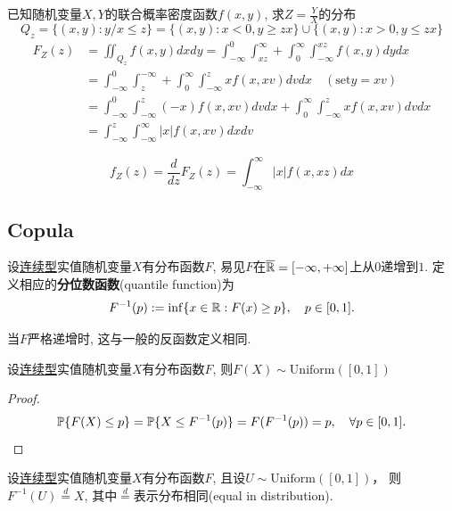 \begin{example}
    已知随机变量$X,Y$的联合概率密度函数$f(x,y)$, 求$Z=\frac{Y}{X}$的分布
    \[ Q_{z}=\{(x, y): y / x \leq z\}=\{(x, y): x<0, y \geq z x\} \cup\{(x, y): x>0, y \leq z x\} \]
    \begin{align*}
        F_{Z}(z) & =\iint_{Q_{z}} f(x, y) d x d y=\int_{-\infty}^{0} \int_{x z}^{\infty}+\int_{0}^{\infty} \int_{-\infty}^{x z} f(x, y) d y d x \\
                 & =\int_{-\infty}^{0} \int_{z}^{-\infty}+\int_{0}^{\infty} \int_{-\infty}^{z} x f(x, x v) d v d x \quad(\text{set} y=x v)      \\
                 & =\int_{-\infty}^{0} \int_{-\infty}^{z}(-x) f(x, x v) d v d x+\int_{0}^{\infty} \int_{-\infty}^{z} x f(x, xv) dvdx            \\
                 & =\int_{-\infty}^{z} \int_{-\infty}^{\infty}|x| f(x, xv) dxdv
    \end{align*}

    \[ f_Z(z)=\frac{d}{dz}F_Z(z)=\int_{-\infty}^{\infty}|x|f(x,xz)dx \]
\end{example}

\subsection{Copula}\label{subsec:Copula}
\begin{definition}
    设\underline{连续型}实值随机变量$X$有分布函数$F$, 易见$F$在$\overline{\R}=[-\infty,+\infty]$上从$0$递增到$1$. 定义相应的\textbf{分位数函数}(quantile function)为
    \[ F^{-1}(p) := \inf\{x\in\R:F(x)\ge p\}, \quad p \in [0,1]. \]
\end{definition}
\begin{remark}
    当$F$严格递增时, 这与一般的反函数定义相同.
\end{remark}

\begin{theorem}
    设\underline{连续型}实值随机变量$X$有分布函数$F$, 则$F(X) \sim \mathrm{Uniform}([0,1])$
\end{theorem}

\begin{proof}
    \[ \P\{F(X)\le p\} = \P\{X\le F^{-1}(p)\} = F(F^{-1}(p)) =p, \quad \forall p \in [0,1]. \]
\end{proof}

\begin{theorem}
    设\underline{连续型}实值随机变量$X$有分布函数$F$, 且设$U\sim\mathrm{Uniform}([0,1]) $， 则$ F^{-1}(U) \overset{d}{=} X$, 其中$\overset{d}{=}$表示分布相同(equal in distribution).
\end{theorem}

